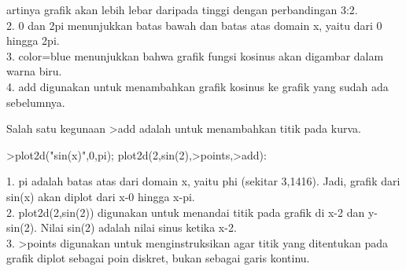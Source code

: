 \documentclass{article}
\begin{document}
\begin{eulernotebook}
\begin{eulercomment}
\begin{eulercomment}
\begin{eulercomment}
\begin{eulercomment}
\begin{eulercomment}
\begin{eulercomment}
\begin{eulercomment}
\begin{eulercomment}
\begin{eulercomment}
\begin{eulercomment}
\begin{eulercomment}
artinya grafik akan lebih lebar daripada tinggi dengan perbandingan
3:2.\\
2. 0 dan 2pi menunjukkan batas bawah dan batas atas domain x, yaitu
dari 0 hingga 2pi.\\
3. color=blue menunjukkan bahwa grafik fungsi kosinus akan digambar
dalam warna biru.\\
4. add digunakan untuk menambahkan grafik kosinus ke grafik yang sudah
ada sebelumnya.

Salah satu kegunaan \textgreater{}add adalah untuk menambahkan titik pada kurva.
\end{eulercomment}
\begin{eulerprompt}
>plot2d("sin(x)",0,pi); plot2d(2,sin(2),>points,>add):
\end{eulerprompt}
\begin{eulercomment}
1. pi adalah batas atas dari domain x, yaitu phi (sekitar 3,1416).
Jadi, grafik dari sin(x) akan diplot dari x-0 hingga x-pi.\\
2. plot2d(2,sin(2)) digunakan untuk menandai titik pada grafik di x-2
dan y-sin(2). Nilai sin(2) adalah nilai sinus ketika x-2.\\
3. \textgreater{}points digunakan untuk menginstruksikan agar titik yang ditentukan
pada grafik diplot sebagai poin diskret, bukan sebagai garis kontinu.


\end{eulercomment}
\end{eulercomment}
\end{eulercomment}
\end{eulercomment}
\end{eulercomment}
\end{eulercomment}
\end{eulercomment}
\end{eulercomment}
\end{eulercomment}
\end{eulercomment}
\end{eulercomment}
\end{eulernotebook}
\end{document}
